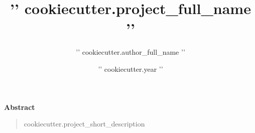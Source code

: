 \documentclass[a4paper,11pt]{{ '{' }}{{ cookiecutter.document_class }}{{ '}' }}
\title{{ '{' }}{{ cookiecutter.project_full_name }}{{ '}' }}
\author{{ '{' }}{{ cookiecutter.author_full_name }}{{ '}' }}
\date{{ '{' }}{{ cookiecutter.year }}{{ '}' }}
\newenvironment{abstract}{%
    \begin{center}\bfseries\abstractname\end{center}
    \begin{quotation}
  }{%
    \end{quotation}
  }
\newcommand{\abstractname}{Abstract}
\begin{document}
\maketitle

\begin{abstract}
{{ cookiecutter.project_short_description }}
\end{abstract}

\tableofcontents
\clearpage



% 
% 
% 
% 

\clearpage


\end{document}
